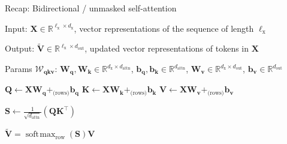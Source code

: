 \documentclass[12pt,aspectratio=169,handout]{beamer}
\DeclareMathOperator*{\softmax}{soft\!\max}
\begin{document}
\begin{frame}{Recap: Bidirectional / unmasked self-attention}
	
	\begin{minipage}[t][10cm][t]{15cm}
		
		Input: $\bm{X} \in \mathbb{R}^{\ell_{\text{x}} \times d_{\text{x}}}$, vector representations of the sequence of length $\ell_{\text{x}}$
		
		Output: $\bm{\tilde{V}} \in \mathbb{R}^{\ell_{\text{x}} \times d_{\text{out}}}$, updated vector representations of tokens in $\bm{X}$
		
		Params $\bm{\mathcal{W}_{qkv}}$: $\bm{W_q}, \bm{W_k} \in \mathbb{R}^{d_\text{x} \times d_\text{attn}}$, $\bm{b_q}, \bm{b_k} \in \mathbb{R}^{d_\text{attn}}$, $\bm{W_v} \in \mathbb{R}^{d_\text{x} \times d_\text{out}}$, $ \bm{b_v} \in \mathbb{R}^{d_\text{out}}$
		
		\begin{algorithmic}[1]
			\State $\bm{Q} \gets \bm{X} \bm{W_q} +_{\text{(rows)}} \bm{b_q}$
			\State $\bm{K} \gets \bm{X} \bm{W_k} +_{\text{(rows)}} \bm{b_k}$
			\State $\bm{V} \gets \bm{X} \bm{W_v} +_{\text{(rows)}} \bm{b_v}$
			
			\State $\bm{S} \gets \frac{1}{\sqrt{d_{\text{attn}}}} (\bm{Q} \bm{K}^\top)$
			
			\State \Return $\bm{\tilde V} = \softmax_{\text{row}}(\bm{S}) \bm{V}$
			
			\EndFunction
		\end{algorithmic}
		
	\end{minipage}
\end{frame}
\end{document}
